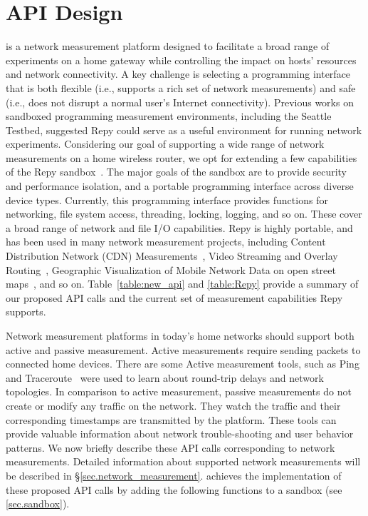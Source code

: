 \section{API Design}
\sysname is a network measurement platform designed to facilitate a broad range of experiments on a home gateway while controlling the impact on hosts' resources and network connectivity. A key challenge is selecting a programming interface that is both flexible (i.e., supports a rich set of network measurements) and safe (i.e., does not disrupt a normal user's Internet connectivity). Previous works on sandboxed programming measurement environments, including the Seattle Testbed, suggested Repy could serve as a useful environment for running network experiments. Considering our goal of supporting a wide range of network measurements on a home wireless router, we opt for extending a few capabilities of the Repy sandbox~\cite{cappos2010retaining}. The major goals of the sandbox are to provide security and performance isolation, and a portable programming interface across diverse device types. Currently, this programming interface provides functions for networking, file system access, threading, locking, logging, and so on. These cover a broad range of network and file I/O capabilities. Repy is highly portable, and has been used in many network measurement projects, including Content Distribution Network (CDN) Measurements~\cite{rafetseder2011exploring}, Video Streaming and Overlay Routing~\cite{eisl2011service}, Geographic Visualization of Mobile Network Data on open street maps~\cite{open3gmap}, and so on. Table~\ref{table:new_api} and \ref{table:Repy} provide a summary of our proposed API calls and the current set of measurement capabilities Repy supports. 

Network measurement platforms in today's home networks should support both active and passive measurement. Active measurements require sending packets to connected home devices. There are some Active measurement tools, such as Ping~\cite{ping} and Traceroute~\cite{traceroute} were used to learn about round-trip delays and network topologies. In comparison to active measurement, passive measurements do not create or modify any traffic on the network. They watch the traffic and their corresponding timestamps are transmitted by the platform. These tools can provide valuable information about network trouble-shooting and user behavior patterns. We now briefly describe these API calls corresponding to network measurements. Detailed information about supported network measurements will be described in \S{\ref{sec.network_measurement}}. \sysname achieves the implementation of these proposed API calls by adding the following functions to a sandbox (see \ref{sec.sandbox}). 

